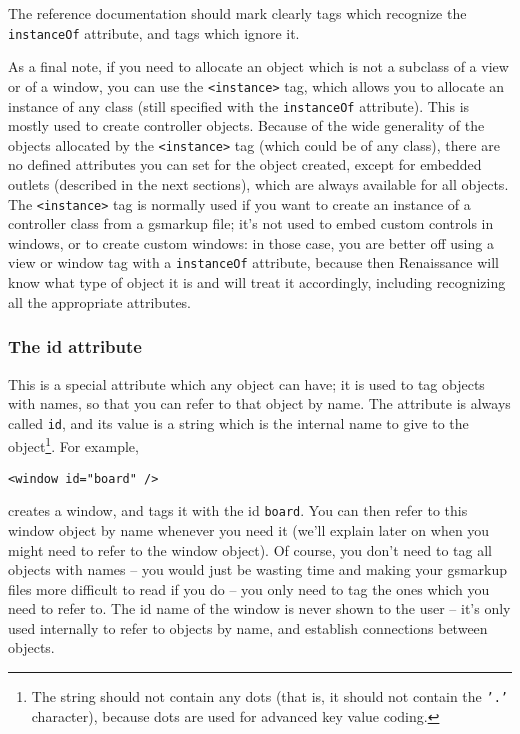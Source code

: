 The reference documentation should mark clearly tags which recognize
the \texttt{instanceOf} attribute, and tags which ignore it.

As a final note, if you need to allocate an object which is not a
subclass of a view or of a window, you can use the \texttt{<instance>}
tag, which allows you to allocate an instance of any class (still
specified with the \texttt{instanceOf} attribute).  This is mostly used to
create controller objects.  Because of the wide generality of the
objects allocated by the \texttt{<instance>} tag (which could be of
any class), there are no defined attributes you can set for the object
created, except for embedded outlets (described in the next sections),
which are always available for all objects.  The \texttt{<instance>}
tag is normally used if you want to create an instance of a controller
class from a gsmarkup file; it's not used to embed custom controls in
windows, or to create custom windows: in those case, you are better
off using a view or window tag with a \texttt{instanceOf} attribute,
because then Renaissance will know what type of object it is and will
treat it accordingly, including recognizing all the appropriate
attributes.

\subsubsection{The id attribute}
This is a special attribute which any object can have; it is used to
tag objects with names, so that you can refer to that object by name.
The attribute is always called \texttt{id}, and its value is a string
which is the internal name to give to the object\footnote{The string
should not contain any dots (that is, it should not contain the
\texttt{'.'} character), because dots are used for advanced key value
coding.}.  For example,
\begin{verbatim}
<window id="board" />
\end{verbatim}
creates a window, and tags it with the id \texttt{board}.  You can
then refer to this window object by name whenever you need it (we'll
explain later on when you might need to refer to the window object).
Of course, you don't need to tag all objects with names -- you would
just be wasting time and making your gsmarkup files more difficult to
read if you do -- you only need to tag the ones which you need to
refer to.  The id name of the window is never shown to the user --
it's only used internally to refer to objects by name, and establish
connections between objects.

